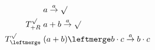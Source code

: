 \documentclass[10pt,a4paper,oneside,ngerman,numbers=noenddot]{scrartcl}
\begin{document}
    \subsection{}
    \begin{alignat*}{2}
        &\; a \overset{a}{\rightarrow} \surd \\
        T^{\surd}_{+R} &\; a + b \overset{a}{\rightarrow} \surd \\
        T^{\surd}_{\leftmerge} &\; (a + b) \leftmerge b \cdot c \overset{a}{\rightarrow} b \cdot c
    \end{alignat*}

\setcounter{section}{5}
\section{} %
\end{document}
